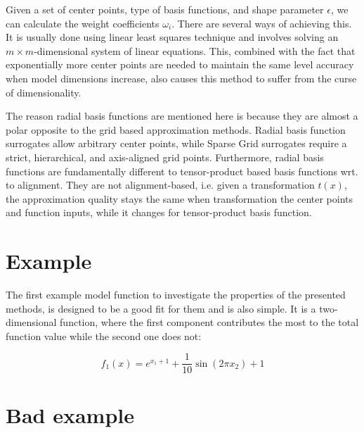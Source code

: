 \documentclass[
  a4paper,  %
  twoside,  %
  bibliography=totoc,
  headsepline,
  cleardoublepage=empty,
  parskip=half,
  draft=false
]{scrbook}
\begin{document}
Given a set of center points, type of basis functions, and shape parameter $\epsilon$, we can calculate the weight coefficients $\omega_i$.
There are several ways of achieving this.
It is usually done using linear least squares technique and involves solving an $m \times m$-dimensional system of linear equations.
This, combined with the fact that exponentially more center points are needed to maintain the same level accuracy when model dimensions increase, also causes this method to suffer from the curse of dimensionality.

The reason radial basis functions are mentioned here is because they are almost a polar opposite to the grid based approximation methods.
Radial basis function surrogates allow arbitrary center points, while Sparse Grid surrogates require a strict, hierarchical, and axis-aligned grid points.
Furthermore, radial basis functions are fundamentally different to tensor-product based basis functions wrt. to alignment.
They are not alignment-based, i.e. given a transformation $t(x)$, the approximation quality stays the same when transformation the center points and function inputs, while it changes for tensor-product basis function.


\section{Example}

The first example model function to investigate the properties of the presented methods, is designed to be a good fit for them and is also simple.
It is a two-dimensional function, where the first component contributes the most to the total function value while the second one does not:

\begin{equation}
f_1(x)=e^{x_1 + 1} + \frac{1}{10}\sin(2 \pi x_2) + 1
\nonumber
\end{equation}







\section{Bad example}
\end{document}
